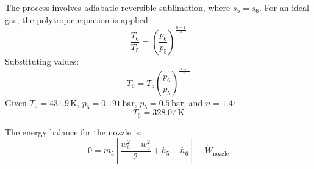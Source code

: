 The process involves adiabatic reversible sublimation, where \( s_5 = s_6 \). For an ideal gas, the polytropic equation is applied:  
\[
\frac{T_6}{T_5} = \left( \frac{p_6}{p_5} \right)^{\frac{n-1}{n}}
\]  
Substituting values:  
\[
T_6 = T_5 \left( \frac{p_6}{p_5} \right)^{\frac{n-1}{n}}
\]  
Given \( T_5 = 431.9 \, \text{K} \), \( p_6 = 0.191 \, \text{bar} \), \( p_5 = 0.5 \, \text{bar} \), and \( n = 1.4 \):  
\[
T_6 = 328.07 \, \text{K}
\]  

The energy balance for the nozzle is:  
\[
0 = \dot{m}_5 \left[ \frac{w_6^2 - w_5^2}{2} + h_5 - h_6 \right] - \dot{W}_{\text{nozzle}}
\]